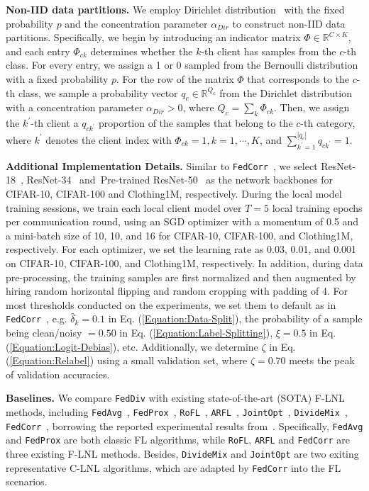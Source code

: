 \documentclass[letterpaper]{article} %
\begin{document}
\noindent
\textbf{Non-IID data partitions.}
We employ Dirichlet distribution~\cite{lin2020ensemble}  with the fixed probability $p$ and the concentration parameter $\alpha_{Dir}$ to construct non-IID data partitions. Specifically, we begin by introducing an indicator matrix $\Phi \in {\mathbb{R}}^{C \times K}$, and each entry ${\Phi}_{ck}$ determines whether the $k$-th client has samples from the $c$-th class. For every entry, we assign a 1 or 0 sampled from the Bernoulli distribution with a fixed probability $p$. For the row of the matrix $\Phi$ that corresponds to the $c$-th class, we sample a probability vector $q_c\in {\mathbb{R}}^{{Q}_{c}}$ from the Dirichlet distribution with a concentration parameter $\alpha_{Dir} > 0$, where ${Q}_{c}=\sum_{k} {\Phi}_{ck}$. Then, we assign the ${k}^{\prime}$-th client a $q_{c{k}^{\prime}}$ proportion of the samples that belong to the $c$-th category, where ${k}^{\prime}$ denotes the client index with ${\Phi}_{ck}=1, k=1, \cdots, K$, and $\sum_{k^{\prime}=1}^{|q_c|} q_{c{k}^{\prime}}=1$.

\noindent
{\bf Additional Implementation Details.} 
Similar to \texttt{FedCorr}~\cite{xu2022fedcorr}, we select ResNet-18~\cite{resnet}, ResNet-34~\cite{resnet} and~Pre-trained ResNet-50~\cite{resnet} as the network backbones for CIFAR-10, CIFAR-100 and Clothing1M, respectively. During the local model training sessions, we train each local client model over $T=5$ local training epochs per communication round, using an SGD optimizer with a momentum of 0.5 and a mini-batch size of 10, 10, and 16 for CIFAR-10, CIFAR-100, and Clothing1M, respectively. 
For each optimizer, we set the learning rate as 0.03, 0.01, and 0.001 on CIFAR-10, CIFAR-100, and Clothing1M, respectively. In addition, during data pre-processing, the training samples are first normalized and then augmented by hiring random horizontal flipping and random cropping with padding of 4. For most thresholds conducted on the experiments, we set them to default as in \texttt{FedCorr}~\cite{xu2022fedcorr}, e.g.  {$\hat{\delta}_{k}=0.1$} in {Eq. (\ref{Equation:Data-Split})}, the probability of a sample being clean/noisy {$= 0.50$} in {Eq. (\ref{Equation:Label-Splitting})}, {$\xi=0.5$} in {Eq. (\ref{Equation:Logit-Debias})}, etc. Additionally, we determine {$\zeta$} in{ Eq. (\ref{Equation:Relabel})} using a small validation set, where $\zeta=0.70$ meets the peak of validation accuracies. 


\noindent
{\bf Baselines.}
We compare \texttt{FedDiv} with existing state-of-the-art (SOTA) F-LNL methods, including \texttt{FedAvg}~\cite{FedAvg}, \texttt{FedProx}~\cite{FedProx}, \texttt{RoFL}~\cite{RoFL}, \texttt{ARFL}~\cite{RoFL}, \texttt{JointOpt}~\cite{JointOpt}, \texttt{DivideMix}~\cite{li2019dividemix}, \texttt{FedCorr}~\cite{xu2022fedcorr}, borrowing the reported experimental results from~\cite{xu2022fedcorr}. Specifically, \texttt{FedAvg} and \texttt{FedProx} are both classic FL algorithms, while \texttt{RoFL}, \texttt{ARFL} and \texttt{FedCorr} are three existing F-LNL methods. Besides, \texttt{DivideMix} and \texttt{JointOpt} are two exiting representative C-LNL algorithms, which are adapted by \texttt{FedCorr}  into the FL scenarios.
 
\end{document}
